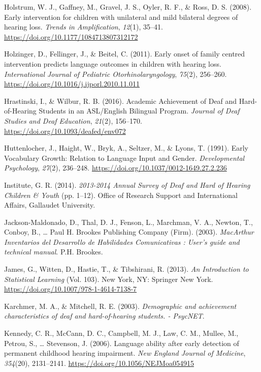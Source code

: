 \documentclass[english,man]{apa6}
\begin{document}
\leavevmode\hypertarget{ref-holstrum2008}{}%
Holstrum, W. J., Gaffney, M., Gravel, J. S., Oyler, R. F., \& Ross, D. S. (2008). Early intervention for children with unilateral and mild bilateral degrees of hearing loss. \emph{Trends in Amplification}, \emph{12}(1), 35--41. \url{https://doi.org/10.1177/1084713807312172}

\leavevmode\hypertarget{ref-holzinger2011}{}%
Holzinger, D., Fellinger, J., \& Beitel, C. (2011). Early onset of family centred intervention predicts language outcomes in children with hearing loss. \emph{International Journal of Pediatric Otorhinolaryngology}, \emph{75}(2), 256--260. \url{https://doi.org/10.1016/j.ijporl.2010.11.011}

\leavevmode\hypertarget{ref-hrastinski2016}{}%
Hrastinski, I., \& Wilbur, R. B. (2016). Academic Achievement of Deaf and Hard-of-Hearing Students in an ASL/English Bilingual Program. \emph{Journal of Deaf Studies and Deaf Education}, \emph{21}(2), 156--170. \url{https://doi.org/10.1093/deafed/env072}

\leavevmode\hypertarget{ref-huttenlocher1991}{}%
Huttenlocher, J., Haight, W., Bryk, A., Seltzer, M., \& Lyons, T. (1991). Early Vocabulary Growth: Relation to Language Input and Gender. \emph{Developmental Psychology}, \emph{27}(2), 236--248. \url{https://doi.org/10.1037/0012-1649.27.2.236}

\leavevmode\hypertarget{ref-gallaudetresearchinstitute2014}{}%
Institute, G. R. (2014). \emph{2013-2014 Annual Survey of Deaf and Hard of Hearing Children \& Youth} (pp. 1--12). Office of Research Support and International Affairs, Gallaudet University.

\leavevmode\hypertarget{ref-jackson-maldonado2003}{}%
Jackson-Maldonado, D., Thal, D. J., Fenson, L., Marchman, V. A., Newton, T., Conboy, B., \ldots{} Paul H. Brookes Publishing Company (Firm). (2003). \emph{MacArthur Inventarios del Desarrollo de Habilidades Comunicativas : User's guide and technical manual}. P.H. Brookes.

\leavevmode\hypertarget{ref-james2013}{}%
James, G., Witten, D., Hastie, T., \& Tibshirani, R. (2013). \emph{An Introduction to Statistical Learning} (Vol. 103). New York, NY: Springer New York. \url{https://doi.org/10.1007/978-1-4614-7138-7}

\leavevmode\hypertarget{ref-karchmer2003}{}%
Karchmer, M. A., \& Mitchell, R. E. (2003). \emph{Demographic and achievement characteristics of deaf and hard-of-hearing students. - PsycNET}.

\leavevmode\hypertarget{ref-kennedy2006}{}%
Kennedy, C. R., McCann, D. C., Campbell, M. J., Law, C. M., Mullee, M., Petrou, S., \ldots{} Stevenson, J. (2006). Language ability after early detection of permanent childhood hearing impairment. \emph{New England Journal of Medicine}, \emph{354}(20), 2131--2141. \url{https://doi.org/10.1056/NEJMoa054915}
\end{document}
